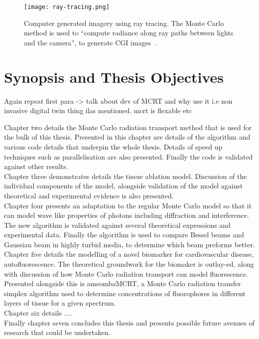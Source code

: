 \begin{figure}[!htb]
\centering
\texttt{[image: ray-tracing.png]}
\caption{Computer generated imagery using ray tracing. The Monte Carlo method is used to ``compute radiance along ray paths between lights and the camera'', to generate CGI images~\cite{pharr2016physically}.}
\label{fig:ray-trace}
\end{figure}


\section{Synopsis and Thesis Objectives}

Again repeat first para -> talk about dev of MCRT and why use it i.e non invasive digital twin thing ilas mentioned. mcrt is flexable etc


Chapter two details the Monte Carlo radiation transport method that is used for the bulk of this thesis.
Presented in this chapter are details of the algorithm and various code details that underpin the whole thesis.
Details of speed up techniques such as parallelisation are also presented.
Finally the code is validated against other results.\\


Chapter three demonstrates details the tissue ablation model.
Discussion of the individual components of the model, alongside validation of the model against theoretical and experimental evidence is also presented.\\


Chapter four presents an adaptation to the regular Monte Carlo model so that it can model wave like properties of photons including diffraction and interference.
The new algorithm is validated against several theoretical expressions and experimental data.
Finally the algorithm is used to compare Bessel beams and Gaussian beam in highly turbid media, to determine which beam preforms better.\\


Chapter five details the modelling of a novel biomarker for cardiovascular disease, autofluorescence.
The theoretical groundwork for the biomaker is outlay-ed, along with discussion of how Monte Carlo radiation transport can model fluorescence.
Presented alongside this is ameombaMCRT, a Monte Carlo radiation transfer simplex algorithm used to determine concentrations of fluorophores in different layers of tissue for a given spectrum.\\
Chapter six details ....\\


Finally chapter seven concludes this thesis and presents possible future avenues of research that could be undertaken.